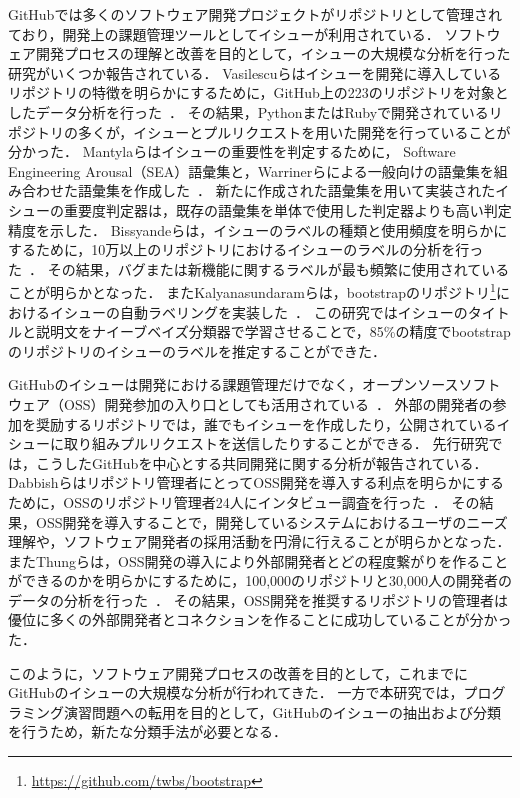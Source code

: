 GitHubでは多くのソフトウェア開発プロジェクトがリポジトリとして管理されており，開発上の課題管理ツールとしてイシューが利用されている．
ソフトウェア開発プロセスの理解と改善を目的として，イシューの大規模な分析を行った研究がいくつか報告されている．
Vasilescuらはイシューを開発に導入しているリポジトリの特徴を明らかにするために，GitHub上の223のリポジトリを対象としたデータ分析を行った~\cite{Continuous_Integration_in_a_Social_Coding_World}．
その結果，PythonまたはRubyで開発されているリポジトリの多くが，イシューとプルリクエストを用いた開発を行っていることが分かった．
Mantylaらはイシューの重要性を判定するために， Software Engineering Arousal（SEA）語彙集と，Warrinerらによる一般向けの語彙集を組み合わせた語彙集を作成した~\cite{Mantyla:issue:word:list}．
新たに作成された語彙集を用いて実装されたイシューの重要度判定器は，既存の語彙集を単体で使用した判定器よりも高い判定精度を示した．
Bissyandeらは，イシューのラベルの種類と使用頻度を明らかにするために，10万以上のリポジトリにおけるイシューのラベルの分析を行った~\cite{Bissyande:gh:issues}．
その結果，バグまたは新機能に関するラベルが最も頻繁に使用されていることが明らかとなった．
またKalyanasundaramらは，bootstrapのリポジトリ\footnote{\url{https://github.com/twbs/bootstrap}}におけるイシューの自動ラベリングを実装した~\cite{kalyanasundaram2014automatic}．
この研究ではイシューのタイトルと説明文をナイーブベイズ分類器で学習させることで，85\%の精度でbootstrapのリポジトリのイシューのラベルを推定することができた．

GitHubのイシューは開発における課題管理だけでなく，オープンソースソフトウェア（OSS）開発参加の入り口としても活用されている~\cite{github_analysis}．
外部の開発者の参加を奨励するリポジトリでは，誰でもイシューを作成したり，公開されているイシューに取り組みプルリクエストを送信したりすることができる．
先行研究では，こうしたGitHubを中心とする共同開発に関する分析が報告されている．
Dabbishらはリポジトリ管理者にとってOSS開発を導入する利点を明らかにするために，OSSのリポジトリ管理者24人にインタビュー調査を行った~\cite{Social_Coding_in_GitHub}．
その結果，OSS開発を導入することで，開発しているシステムにおけるユーザのニーズ理解や，ソフトウェア開発者の採用活動を円滑に行えることが明らかとなった．
またThungらは，OSS開発の導入により外部開発者とどの程度繋がりを作ることができるのかを明らかにするために，100,000のリポジトリと30,000人の開発者のデータの分析を行った~\cite{Network_Structure_of_Social_Coding}．
その結果，OSS開発を推奨するリポジトリの管理者は優位に多くの外部開発者とコネクションを作ることに成功していることが分かった．

このように，ソフトウェア開発プロセスの改善を目的として，これまでにGitHubのイシューの大規模な分析が行われてきた．
一方で本研究では，プログラミング演習問題への転用を目的として，GitHubのイシューの抽出および分類を行うため，新たな分類手法が必要となる．



